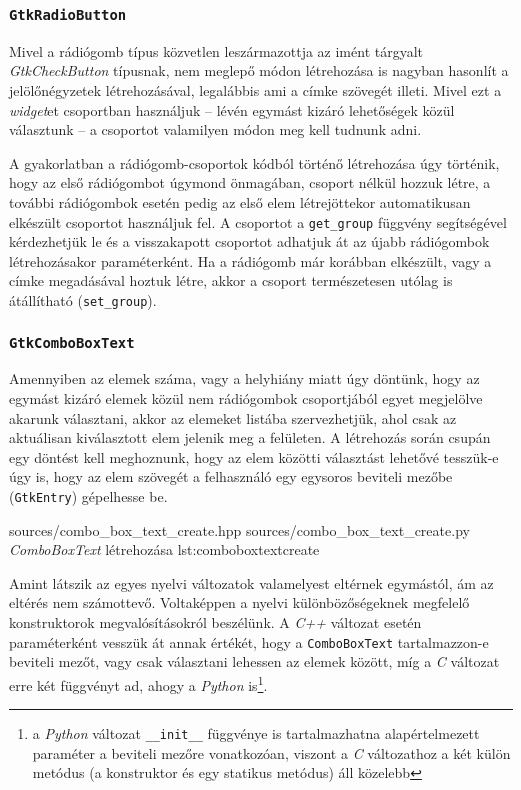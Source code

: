 \subsubsection{\texttt{GtkRadioButton}}

Mivel a rádiógomb típus közvetlen leszármazottja az imént tárgyalt \textit{GtkCheckButton} típusnak, nem meglepő módon létrehozása is nagyban hasonlít a jelölőnégyzetek létrehozásával, legalábbis ami a címke szövegét illeti. Mivel ezt a \textit{widget}et csoportban használjuk -- lévén egymást kizáró lehetőségek közül választunk -- a csoportot valamilyen módon meg kell tudnunk adni.


A gyakorlatban a rádiógomb-csoportok kódból történő létrehozása úgy történik, hogy az első rádiógombot úgymond önmagában, csoport nélkül hozzuk létre, a további rádiógombok esetén pedig az első elem létrejöttekor automatikusan elkészült csoportot használjuk fel. A csoportot a \texttt{get\_group} függvény segítségével kérdezhetjük le és a visszakapott csoportot adhatjuk át az újabb rádiógombok létrehozásakor paraméterként. Ha a rádiógomb már korábban elkészült, vagy a címke megadásával hoztuk létre, akkor a csoport természetesen utólag is átállítható (\texttt{set\_group}).

\subsubsection{\texttt{GtkComboBoxText}}

Amennyiben az elemek száma, vagy a helyhiány miatt úgy döntünk, hogy az egymást kizáró elemek közül nem rádiógombok csoportjából egyet megjelölve akarunk választani, akkor az elemeket listába szervezhetjük, ahol csak az aktuálisan kiválasztott elem jelenik meg a felületen. A létrehozás során csupán egy döntést kell meghoznunk, hogy az elem közötti választást lehetővé tesszük-e úgy is, hogy az elem szövegét a felhasználó egy egysoros beviteli mezőbe (\texttt{GtkEntry}) gépelhesse be.

{sources/combo_box_text_create.hpp}
{sources/combo_box_text_create.py}
{\textit{ComboBoxText} létrehozása}
{lst:comboboxtextcreate}


Amint látszik az egyes nyelvi változatok valamelyest eltérnek egymástól, ám az eltérés nem számottevő. Voltaképpen a nyelvi különbözőségeknek megfelelő konstruktorok megvalósításokról beszélünk. A \textit{C++} változat esetén paraméterként vesszük át annak értékét, hogy a \texttt{ComboBoxText} tartalmazzon-e beviteli mezőt, vagy csak választani lehessen az elemek között, míg a \textit{C} változat erre két függvényt ad, ahogy a \textit{Python} is\footnote{a \textit{Python} változat \texttt{\_\_init\_\_} függvénye is tartalmazhatna alapértelmezett paraméter a beviteli mezőre vonatkozóan, viszont a \textit{C} változathoz a két külön metódus (a konstruktor és egy statikus metódus) áll közelebb}.

